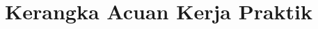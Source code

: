 \chapter{Kerangka Acuan Kerja Praktik}\label{app:tor}
\begingroup
\small\singlespacing\setlength{\parindent}{0pt}\setlength{\parskip}{6pt}

\endgroup
